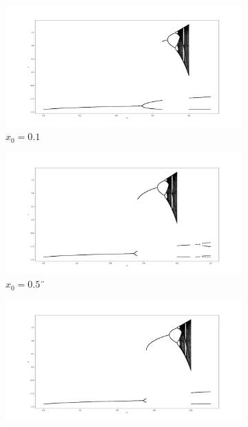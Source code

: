 \begin{figure}[h!]
	\centering
	
	\begin{subfigure}[b]{0.7\textwidth}
		\centering
		\includegraphics[width=\textwidth]{LateX images/graphs q14/g1}
		\caption{\(x_0=0.1\)}
		\label{f:g19}
	\end{subfigure}
	\hfill
	\begin{subfigure}[b]{0.7\textwidth}
		\centering
		\includegraphics[width=\textwidth]{LateX images/graphs q14/g2}
		\caption{\(x_0=0.5\)¨}
		\label{f:g20}
	\end{subfigure}
	\hfill
	\begin{subfigure}[b]{0.7\textwidth}
		\centering
		\includegraphics[width=\textwidth]{LateX images/graphs q14/g3}

\end{subfigure}
\end{figure}
